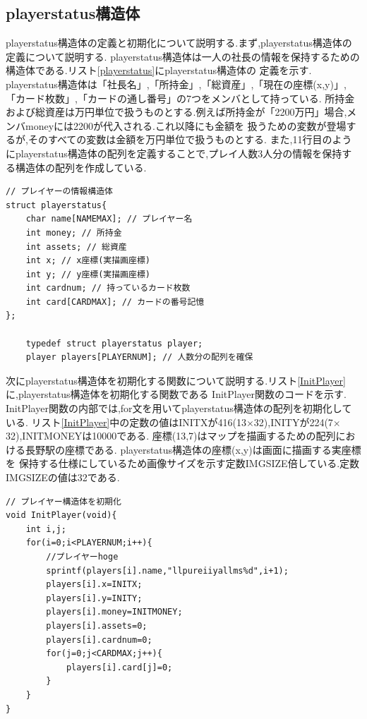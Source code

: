 \documentclass[a4j]{jarticle}
\begin{document}
    \subsection{playerstatus構造体}
    playerstatus構造体の定義と初期化について説明する.まず,playerstatus構造体の定義について説明する.
    playerstatus構造体は一人の社長の情報を保持するための構造体である.リスト\ref{playerstatus}にplayerstatus構造体の
    定義を示す. playerstatus構造体は「社長名」,「所持金」,「総資産」,「現在の座標(x,y)」,「カード枚数」,「カードの通し番号」の7つをメンバとして持っている.
    所持金および総資産は万円単位で扱うものとする.例えば所持金が「2200万円」場合,メンバmoneyには2200が代入される.これ以降にも金額を
    扱うための変数が登場するが,そのすべての変数は金額を万円単位で扱うものとする.
    また,11行目のようにplayerstatus構造体の配列を定義することで,プレイ人数3人分の情報を保持する構造体の配列を作成している.
    \begin{lstlisting}[basicstyle=\ttfamily\footnotesize, frame=single,label=playerstatus,caption=playerstatus構造体の定義と初期化]
// プレイヤーの情報構造体
struct playerstatus{
    char name[NAMEMAX]; // プレイヤー名
    int money; // 所持金
    int assets; // 総資産
    int x; // x座標(実描画座標)
    int y; // y座標(実描画座標)
    int cardnum; // 持っているカード枚数
    int card[CARDMAX]; // カードの番号記憶
};
    
    typedef struct playerstatus player;
    player players[PLAYERNUM]; // 人数分の配列を確保
    \end{lstlisting}

    次にplayerstatus構造体を初期化する関数について説明する.リスト\ref{InitPlayer}に,playerstatus構造体を初期化する関数である
    InitPlayer関数のコードを示す. InitPlayer関数の内部では,for文を用いてplayerstatus構造体の配列を初期化している.
    リスト\ref{InitPlayer}中の定数の値はINITXが416(13$\times$32),INITYが224(7$\times$32),INITMONEYは10000である.
    座標(13,7)はマップを描画するための配列における長野駅の座標である. playerstatus構造体の座標(x,y)は画面に描画する実座標を
    保持する仕様にしているため画像サイズを示す定数IMGSIZE倍している.定数IMGSIZEの値は32である.
    \begin{lstlisting}[basicstyle=\ttfamily\footnotesize, frame=single,label=InitPlayer,caption=InitPlayer関数]
// プレイヤー構造体を初期化
void InitPlayer(void){
    int i,j;
    for(i=0;i<PLAYERNUM;i++){
        //プレイヤーhoge
        sprintf(players[i].name,"llpureiiyallms%d",i+1);
        players[i].x=INITX;
        players[i].y=INITY;
        players[i].money=INITMONEY;
        players[i].assets=0;
        players[i].cardnum=0;
        for(j=0;j<CARDMAX;j++){
            players[i].card[j]=0;
        }
    }
}
            \end{lstlisting}
\end{document}
